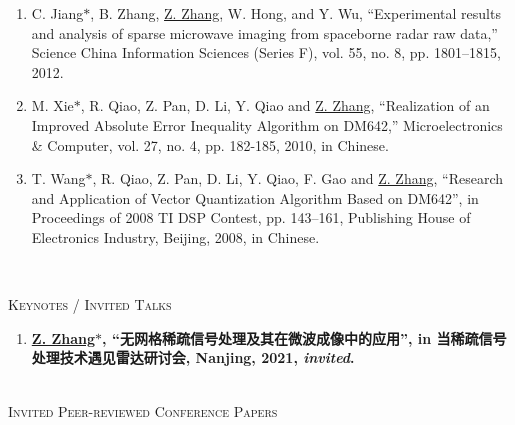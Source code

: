 \documentclass[paper=a4,fontsize=11pt]{scrartcl}
\begin{document}
\begin{enumerate}
	\item C. Jiang$\ast$, B. Zhang, \underline{Z. Zhang}, W. Hong, and Y. Wu, ``Experimental results and analysis of sparse microwave imaging from spaceborne radar raw data,'' Science China Information Sciences (Series F), vol. 55, no. 8, pp. 1801--1815, 2012.
	
	
	\item M. Xie$\ast$, R. Qiao, Z. Pan, D. Li, Y. Qiao and \underline{Z. Zhang}, ``Realization of an Improved Absolute Error Inequality Algorithm on DM642,'' Microelectronics \& Computer, vol. 27, no. 4, pp. 182-185, 2010, in Chinese.
	
	\item T. Wang$\ast$, R. Qiao, Z. Pan, D. Li, Y. Qiao, F. Gao and \underline{Z. Zhang}, ``Research and Application of Vector Quantization Algorithm Based on DM642'', in Proceedings of 2008 TI DSP Contest, pp. 143--161, Publishing House of Electronics Industry, Beijing, 2008, in Chinese. 
	
	~\\
	
\end{enumerate}

\textsc{Keynotes / Invited Talks}

\begin{enumerate}
	
	\item \textbf{\underline{Z. Zhang$\ast$}, ``无网格稀疏信号处理及其在微波成像中的应用'', in 当稀疏信号处理技术遇见雷达研讨会, Nanjing, 2021, \emph{invited}.}
	
\end{enumerate}

~\\

\textsc{Invited Peer-reviewed Conference Papers}
\end{document}
